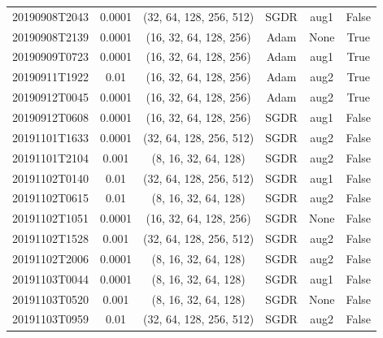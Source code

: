\begin{table}[!ht]
\begin{adjustbox}{width=\columnwidth, center}
\begin{tabular}{cccccc}
			20190908T2043 &       0.0001 &  (32, 64, 128, 256, 512) &      SGDR &                  aug1 &                  False \\
			20190908T2139 &       0.0001 &   (16, 32, 64, 128, 256) &      Adam &                  None &                   True \\
			20190909T0723 &       0.0001 &   (16, 32, 64, 128, 256) &      Adam &                  aug1 &                   True \\
			20190911T1922 &         0.01 &   (16, 32, 64, 128, 256) &      Adam &                  aug2 &                   True \\
			20190912T0045 &       0.0001 &   (16, 32, 64, 128, 256) &      Adam &                  aug2 &                   True \\
			20190912T0608 &       0.0001 &   (16, 32, 64, 128, 256) &      SGDR &                  aug1 &                  False \\
			20191101T1633 &       0.0001 &  (32, 64, 128, 256, 512) &      SGDR &                  aug2 &                  False \\
			20191101T2104 &        0.001 &     (8, 16, 32, 64, 128) &      SGDR &                  aug2 &                  False \\
			20191102T0140 &         0.01 &  (32, 64, 128, 256, 512) &      SGDR &                  aug1 &                  False \\
			20191102T0615 &         0.01 &     (8, 16, 32, 64, 128) &      SGDR &                  aug2 &                  False \\
			20191102T1051 &       0.0001 &   (16, 32, 64, 128, 256) &      SGDR &                  None &                  False \\
			20191102T1528 &        0.001 &  (32, 64, 128, 256, 512) &      SGDR &                  aug2 &                  False \\
			20191102T2006 &       0.0001 &     (8, 16, 32, 64, 128) &      SGDR &                  aug2 &                  False \\
			20191103T0044 &       0.0001 &     (8, 16, 32, 64, 128) &      SGDR &                  aug1 &                  False \\
			20191103T0520 &        0.001 &     (8, 16, 32, 64, 128) &      SGDR &                  None &                  False \\
			20191103T0959 &         0.01 &  (32, 64, 128, 256, 512) &      SGDR &                  aug2 &                  False \\

\end{tabular}
\end{adjustbox}
\end{table}
